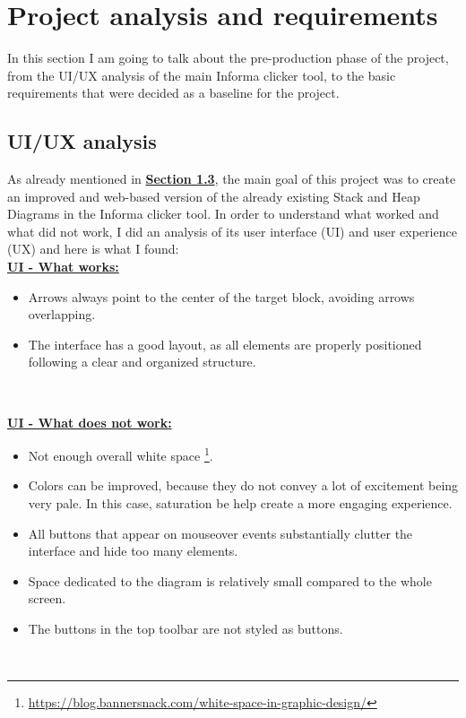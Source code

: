 \documentclass[]{usiinfbachelorproject}
\begin{document}
\section{Project analysis and requirements} \label{requirements+analysis}

In this section I am going to talk about the pre-production phase of the project, from the UI/UX analysis of the main Informa clicker tool, to the basic requirements that were decided as a baseline for the project.

\subsection{UI/UX analysis}

As already mentioned in \hyperref[goal]{\textbf{Section 1.3}}, the main goal of this project was to create an improved and web-based version of the already existing Stack and Heap Diagrams in the Informa clicker tool. In order to understand what worked and what did not work, I did an analysis of its user interface (UI) and user experience (UX) and here is what I found:\\

\textbf{\ul{UI - What works:}}

\begin{itemize}
	\item Arrows always point to the center of the target block, avoiding arrows overlapping.
	\item The interface has a good layout, as all elements are properly positioned following a clear and organized structure.
\end{itemize}\

\textbf{\ul{UI - What does not work:}}

\begin{itemize}
	\item Not enough overall white space \footnote{\url{https://blog.bannersnack.com/white-space-in-graphic-design/}}.
	\item Colors can be improved, because they do not convey a lot of excitement being very pale. In this case, saturation be help create a more engaging experience.
	\item All buttons that appear on mouseover events substantially clutter the interface and hide too many elements.
	\item Space dedicated to the diagram is relatively small compared to the whole screen.
	\item The buttons in the top toolbar are not styled as buttons.
\end{itemize}\
\end{document}
